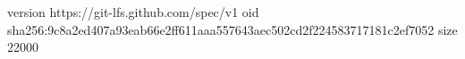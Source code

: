 version https://git-lfs.github.com/spec/v1
oid sha256:9c8a2ed407a93eab66e2ff611aaa557643aec502cd2f224583717181c2ef7052
size 22000
